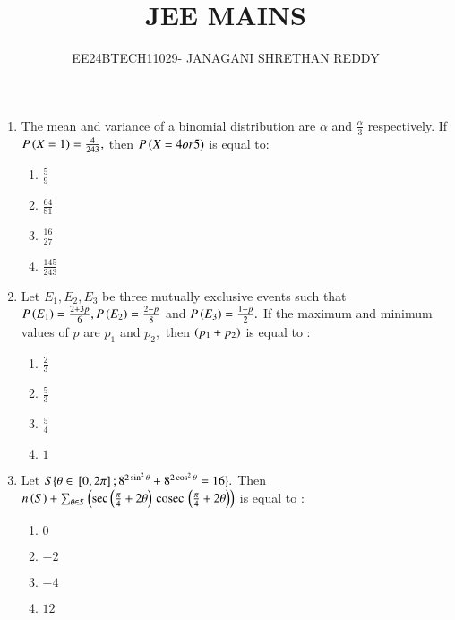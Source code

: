 \documentclass[journal,12pt,twocolumn]{IEEEtran}
\theoremstyle{remark}
\begin{document}
 


\vspace{3cm}

\title{JEE MAINS}
\author{EE24BTECH11029- JANAGANI SHRETHAN REDDY}
\maketitle{}
\newpage
\bigskip
\renewcommand{\thefigure}{\theenumi}
\renewcommand{\thetable}{\theenum}
\begin{enumerate}
    \item The mean and variance of a binomial distribution are $\alpha$ and $\frac{\alpha}{3}$ respectively. If $P\left(X=1\right)=\frac{4}{243},$ then $P\left(X=4 or 5\right)$ is equal to:
    \begin{enumerate}
        \item $\frac{5}{9}$
        \item $\frac{64}{81}$
        \item $\frac{16}{27}$
        \item $\frac{145}{243}$\\
    \end{enumerate}
    \item Let $E_1,E_2,E_3$ be three mutually exclusive events such that $P\left(E_1\right)=\frac{2+3p}{6},P\left(E_2\right)=\frac{2-p}{8}$ and $P\left(E_3\right)=\frac{1-p}{2}.$ If the maximum and minimum values of $p$ are $p_1$ and $p_2,$ then $\left(p_1+p_2\right)$ is equal to :
    \begin{enumerate}
        \item $\frac{2}{3}$
        \item $\frac{5}{3}$
        \item $\frac{5}{4}$
        \item $1$\\
    \end{enumerate}
    \item Let $S\{\theta\in{}\left[0,2\pi\right];8^{2\sin^2\theta}+8^{2\cos^2\theta}=16\}.$ Then $n\left(S\right)+\sum_{\theta\in S}\left(\sec\left(\frac{\pi}{4}+2\theta\right)\,\text{cosec}\,\left(\frac{\pi}{4}+2\theta\right)\right)$ is equal to :
    \begin{enumerate}
        \item $0$
        \item $-2$
        \item $-4$
        \item $12$\\
    \end{enumerate}

\end{enumerate}
\end{document}

